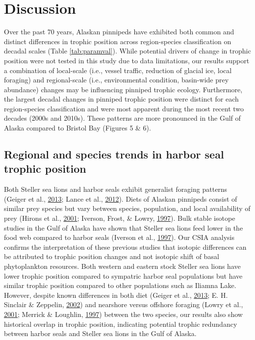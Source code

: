 \documentclass [11pt, proquest] {uwthesis}[2015/03/03]
\begin{document}
\section{Discussion}\label{discussion-2}

Over the past 70 years, Alaskan pinnipeds have exhibited both common and
distinct differences in trophic position across region-species
classification on decadal scales (Table \ref{tab:paramval}). While
potential drivers of change in trophic position were not tested in this
study due to data limitations, our results support a combination of
local-scale (i.e., vessel traffic, reduction of glacial ice, local
foraging) and regional-scale (i.e., environmental condition, basin-wide
prey abundance) changes may be influencing pinniped trophic ecology.
Furthermore, the largest decadal changes in pinniped trophic position
were distinct for each region-species classification and were most
apparent during the most recent two decades (2000s and 2010s). These
patterns are more pronounced in the Gulf of Alaska compared to Bristol
Bay (Figures 5 \& 6).

\subsection{Regional and species trends in harbor seal trophic
position}\label{regional-and-species-trends-in-harbor-seal-trophic-position}

Both Steller sea lions and harbor seals exhibit generalist foraging
patterns (Geiger et al., \protect\hyperlink{ref-Geiger2013}{2013}; Lance
et al., \protect\hyperlink{ref-Lance2012}{2012}). Diets of Alaskan
pinnipeds consist of similar prey species but vary between species,
population, and local availability of prey (Hirons et al.,
\protect\hyperlink{ref-Hirons2001}{2001}; Iverson, Frost, \& Lowry,
\protect\hyperlink{ref-Iverson1997}{1997}). Bulk stable isotope studies
in the Gulf of Alaska have shown that Steller sea lions feed lower in
the food web compared to harbor seals (Iverson et al.,
\protect\hyperlink{ref-Iverson1997}{1997}). Our CSIA analysis confirms
the interpretation of these previous studies that isotopic differences
can be attributed to trophic position changes and not isotopic shift of
basal phytoplankton resources. Both western and eastern stock Steller
sea lions have lower trophic position compared to sympatric harbor seal
populations but have similar trophic position compared to other
populations such as Iliamna Lake. However, despite known differences in
both diet (Geiger et al., \protect\hyperlink{ref-Geiger2013}{2013}; E.
H. Sinclair \& Zeppelin, \protect\hyperlink{ref-Sinclair2002}{2002}) and
nearshore versus offshore foraging (Lowry et al.,
\protect\hyperlink{ref-Lowry2001}{2001}; Merrick \& Loughlin,
\protect\hyperlink{ref-Merrick1997}{1997}) between the two species, our
results also show historical overlap in trophic position, indicating
potential trophic redundancy between harbor seals and Steller sea lions
in the Gulf of Alaska.
\end{document}
